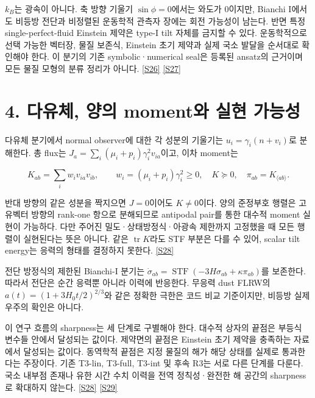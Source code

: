 \documentclass[11pt,a4paper]{article}
\begin{document}
\(k_B\)는 광속이 아니다. 축 방향 기울기 \(\sin\phi=0\)에서는 와도가 0이지만, Bianchi I에서도 비등방 전단과 비정렬된 운동학적 관측자 장에는 회전 가능성이 남는다. 반면 특정 single-perfect-fluid Einstein 제약은 type-I tilt 자체를 금지할 수 있다. 운동학적으로 선택 가능한 벡터장, 물질 보존식, Einstein 초기 제약과 실제 국소 발달을 순서대로 확인해야 한다. 이 분기의 기존 symbolic·numerical seal은 등록된 ansatz의 근거이며 모든 물질 모형의 분류 정리가 아니다. \hyperlink{src:S26}{[S26]} \hyperlink{src:S27}{[S27]}


\hypertarget{s4}{}

\section*{4. 다유체, 양의 moment와 실현 가능성}


다유체 분기에서 normal observer에 대한 각 성분의 기울기는 \(u_i=\gamma_i(n+v_i)\)로 분해한다. 총 flux는 \(J_a=\sum_i(\mu_i+p_i)\gamma_i^2v_{ia}\)이고, 이차 moment는


\[
K_{ab}=\sum_i w_i v_{ia}v_{ib},\qquad
w_i=(\mu_i+p_i)\gamma_i^2\ge0,
\quad K\succeq0,
\quad \pi_{ab}=K_{\langle ab\rangle}.
\]

반대 방향의 같은 성분을 짝지으면 \(J=0\)이어도 \(K\ne0\)이다. 양의 준정부호 행렬은 고유벡터 방향의 rank-one 항으로 분해되므로 antipodal pair를 통한 대수적 moment 실현이 가능하다. 다만 주어진 밀도·상태방정식·아광속 제한까지 고정했을 때 모든 행렬이 실현된다는 뜻은 아니다. 같은 \(\operatorname{tr}K\)라도 STF 부분은 다를 수 있어, scalar tilt energy는 응력의 형태를 결정하지 못한다. \hyperlink{src:S28}{[S28]}


전단 방정식의 제한된 Bianchi-I 분기는 \(\dot\sigma_{ab}=\operatorname{STF}(-3H\sigma_{ab}+\kappa\pi_{ab})\)를 보존한다. 따라서 전단은 순간 응력뿐 아니라 이력에 반응한다. 무응력 dust FLRW의 \(a(t)=(1+3H_0t/2)^{2/3}\)와 같은 정확한 극한은 코드 비교 기준이지만, 비등방 실제 우주의 확인은 아니다.


이 연구 흐름의 sharpness는 세 단계로 구별해야 한다. 대수적 상자의 끝점은 부등식 변수들 안에서 달성되는 값이다. 제약면의 끝점은 Einstein 초기 제약을 충족하는 자료에서 달성되는 값이다. 동역학적 끝점은 지정 물질의 해가 해당 상태를 실제로 통과한다는 주장이다. 기존 T3-lin, T3-full, T3-int 및 후속 R3는 서로 다른 단계를 다룬다. 국소 내부점 존재나 유한 시간 수치 이력을 전역 정칙성·완전한 해 공간의 sharpness로 확대하지 않는다. \hyperlink{src:S28}{[S28]} \hyperlink{src:S29}{[S29]}
\end{document}
